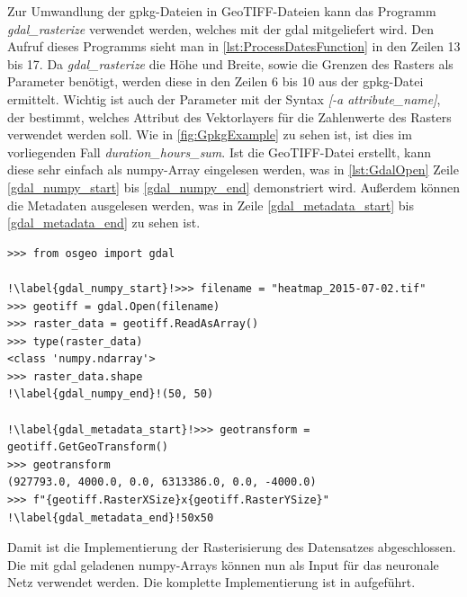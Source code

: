 Zur Umwandlung der \acrshort{gpkg}-Dateien in GeoTIFF-Dateien kann das Programm \emph{gdal\_rasterize} verwendet werden, welches mit der \acrfull{gdal} mitgeliefert wird.
Den Aufruf dieses Programms sieht man in \autoref{lst:ProcessDatesFunction} in den Zeilen 13 bis 17.
Da \emph{gdal\_rasterize} die Höhe und Breite, sowie die Grenzen des Rasters als Parameter benötigt, werden diese in den Zeilen 6 bis 10 aus der \acrshort{gpkg}-Datei ermittelt.
Wichtig ist auch der Parameter mit der Syntax \emph{[-a attribute\_name]}, der bestimmt, welches Attribut des Vektorlayers für die Zahlenwerte des Rasters verwendet werden soll.
Wie in \autoref{fig:GpkgExample} zu sehen ist, ist dies im vorliegenden Fall \emph{duration\_hours\_sum}.
Ist die GeoTIFF-Datei erstellt, kann diese sehr einfach als numpy-Array eingelesen werden, was in \autoref{lst:GdalOpen} Zeile \ref{gdal_numpy_start} bis \ref{gdal_numpy_end} demonstriert wird.
Außerdem können die Metadaten ausgelesen werden, was in Zeile \ref{gdal_metadata_start} bis \ref{gdal_metadata_end} zu sehen ist.

\begin{minipage}{\textwidth}
\begin{code}
\begin{verbatim}
>>> from osgeo import gdal

!\label{gdal_numpy_start}!>>> filename = "heatmap_2015-07-02.tif"
>>> geotiff = gdal.Open(filename)
>>> raster_data = geotiff.ReadAsArray()
>>> type(raster_data)
<class 'numpy.ndarray'>
>>> raster_data.shape
!\label{gdal_numpy_end}!(50, 50)

!\label{gdal_metadata_start}!>>> geotransform = geotiff.GetGeoTransform()
>>> geotransform
(927793.0, 4000.0, 0.0, 6313386.0, 0.0, -4000.0)
>>> f"{geotiff.RasterXSize}x{geotiff.RasterYSize}"
!\label{gdal_metadata_end}!50x50
\end{verbatim}
\label{lst:GdalOpen}
\end{code}
\end{minipage}

Damit ist die Implementierung der Rasterisierung des Datensatzes abgeschlossen.
Die mit \acrshort{gdal} geladenen numpy-Arrays können nun als Input für das neuronale Netz verwendet werden.
Die komplette Implementierung ist in  aufgeführt.
